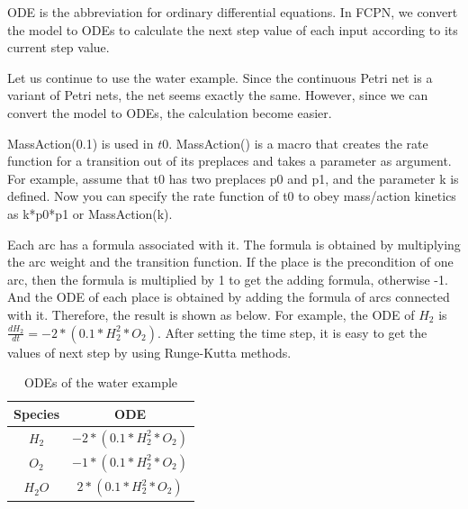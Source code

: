 \documentclass[journal,a4paper,onecolumn]{article}
\newcommand{\comR}[1]{\textcolor{red}{\emph{#1}}}
\newcommand{\comB}[1]{\textcolor{blue}{\emph{#1}}}
\begin{document}
ODE is the abbreviation for ordinary differential equations. In FCPN, we convert the model to ODEs to calculate the next step value of each input according to its current step value.

Let us continue to use the water example. Since the continuous Petri net is a variant of Petri nets, the net seems exactly the same. However, since we can convert the model to ODEs, the calculation become easier. 

MassAction(0.1) is used in $t0$. MassAction() is a macro that creates the rate function for a transition out of its preplaces and takes a parameter as argument. For example, assume that t0 has two preplaces p0 and p1, and the parameter k is defined. Now you can specify the rate function of t0 to obey mass/action kinetics as k*p0*p1 or MassAction(k). 

Each arc has a formula associated with it. The formula is obtained by multiplying the arc weight and the transition function. If the place is the precondition of one arc, then the formula is multiplied by 1 to get the adding formula, otherwise -1. And the ODE of each place is obtained by adding the formula of arcs connected with it. Therefore, the result is shown as below. For example, the ODE of $H_2$ is $\frac{dH_2}{dt}=-2*(0.1*H_2^2*O_2)$. After setting the time step, it is easy to get the values of next step by using Runge-Kutta methods.
\begin{table}[!hbt]
	\begin{center}
		\caption{ODEs of the water example}
		\label{tab:ODEs of the water example}
		\begin{tabular}{|c|c|}
			\hline
			Species&ODE\\
			\hline
			$H_2$&$-2*(0.1*H_2^2*O_2)$\\
			\hline
			$O_2$&$-1*(0.1*H_2^2*O_2)$\\
			\hline
			$H_2O$&$2*(0.1*H_2^2*O_2)$\\
			\hline
		\end{tabular}
	\end{center}
\end{table}

 
\end{document}

